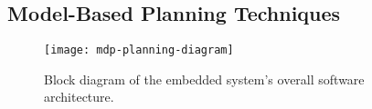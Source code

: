% 

\subsection{Model-Based Planning Techniques}
\label{subsec:model-based-planning}

\begin{figure}[ht!]
	\centering
	\texttt{[image: mdp-planning-diagram]}
	\caption{Block diagram of the embedded system's overall software architecture.}
	\label{fig:architecture}
\end{figure}

% 










